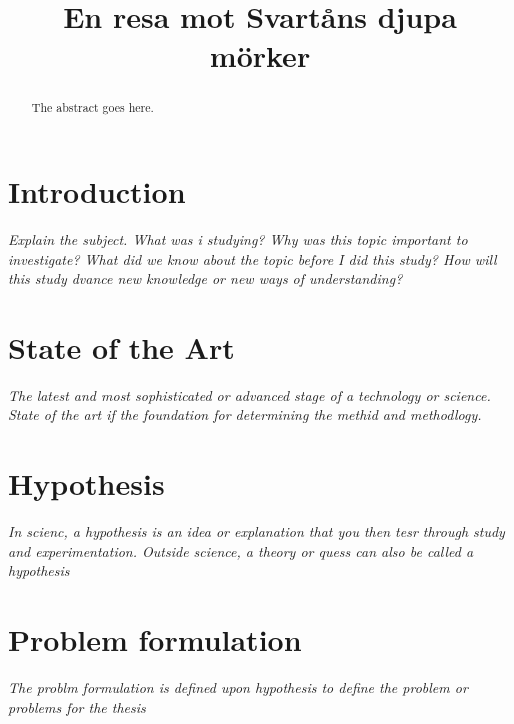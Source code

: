 \documentclass[conference]{IEEEtran}
\begin{document}
\title{En resa mot Svartåns djupa mörker}

\author{
\and
}

\maketitle


\begin{abstract}
The abstract goes here.
\end{abstract}

\section{Introduction}
\textit{Explain the subject. What was i studying? Why was this topic important to investigate? What did we know about the topic before I did this study? How will this study dvance new knowledge or new ways of understanding?}
\section{State of the Art}
\textit{The latest and most sophisticated or advanced stage of a technology or science. State of the art if the foundation for determining the methid and methodlogy.}
\section{Hypothesis}
\textit{In scienc, a hypothesis is an idea or explanation that you then tesr through study and experimentation. Outside science, a theory or quess can also be called a hypothesis}
\section{Problem formulation}
\textit{The problm formulation is defined upon hypothesis to define the problem or problems for the thesis}
\end{document}
